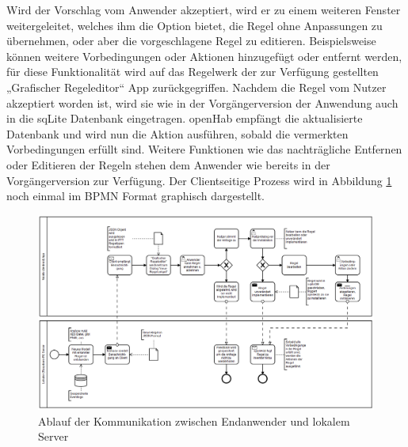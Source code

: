 Wird der Vorschlag vom Anwender akzeptiert, wird er zu einem weiteren Fenster weitergeleitet, welches ihm die Option bietet, die Regel ohne Anpassungen zu übernehmen, oder aber die vorgeschlagene Regel zu editieren. Beispielsweise können weitere Vorbedingungen oder Aktionen hinzugefügt oder entfernt werden, für diese Funktionalität wird auf das Regelwerk der zur Verfügung gestellten „Grafischer Regeleditor“ App zurückgegriffen. 
Nachdem die Regel vom Nutzer akzeptiert worden ist, wird sie wie in der Vorgängerversion der Anwendung auch in die sqLite Datenbank eingetragen. openHab empfängt die aktualisierte Datenbank und wird nun die Aktion ausführen, sobald die vermerkten Vorbedingungen erfüllt sind.
Weitere Funktionen wie das nachträgliche Entfernen oder Editieren der Regeln stehen dem Anwender wie bereits in der Vorgängerversion zur Verfügung.
Der Clientseitige Prozess wird in Abbildung \ref{fig:Kommunikationsablauf} noch einmal im BPMN Format graphisch dargestellt.
\newpage
\begin{figure}[!ht]
    \centering
    \includegraphics[width= 1.47\textwidth, angle=90,origin=c]{figures/Appbildungen/diagramm_app.PNG}
    \caption{Ablauf der Kommunikation zwischen Endanwender und lokalem Server}
    \label{fig:Kommunikationsablauf}
\end{figure}
